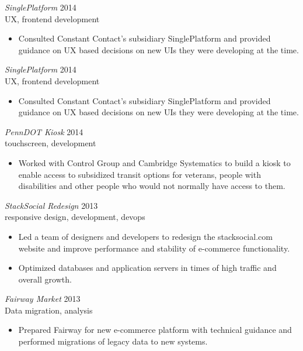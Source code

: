 \documentclass[line,margin]{res}
\begin{document}
\begin{resume}
    {\sl SinglePlatform}
    \hfill 2014 \\
    UX, frontend development
    \begin{itemize} \itemsep -2pt
        \item
            Consulted Constant Contact's subsidiary SinglePlatform and provided guidance
            on UX based decisions on new UIs they were developing at the time.
    \end{itemize}

    {\sl SinglePlatform}
    \hfill 2014 \\
    UX, frontend development
    \begin{itemize} \itemsep -2pt
        \item
            Consulted Constant Contact's subsidiary SinglePlatform and provided guidance
            on UX based decisions on new UIs they were developing at the time.
    \end{itemize}

    {\sl PennDOT Kiosk}
    \hfill 2014 \\
    touchscreen, development
    \begin{itemize} \itemsep -2pt
        \item
            Worked with Control Group and Cambridge Systematics to build a kiosk to
            enable access to subsidized transit options for veterans, people with
            disabilities and other people who would not normally have access to them.
    \end{itemize}

    {\sl StackSocial Redesign}
    \hfill 2013 \\
    responsive design, development, devops
    \begin{itemize} \itemsep -2pt
        \item
            Led a team of designers and developers to redesign the stacksocial.com website
            and improve performance and stability of e-commerce functionality.
        \item
            Optimized databases and application servers in times of high traffic and overall
            growth.
    \end{itemize}

    {\sl Fairway Market}
    \hfill 2013 \\
    Data migration, analysis
    \begin{itemize} \itemsep -2pt
        \item
            Prepared Fairway for new e-commerce platform with technical
            guidance and performed migrations of legacy data to new systems.


\end{itemize}
\end{resume}
\end{document}
